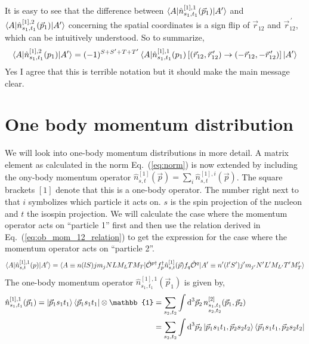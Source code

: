\documentclass[10pt]{article}
\begin{document}
It is easy to see that the difference between $\braket{ A | 
\hat{n}^{[1],1}_{s_1,t_1}(\vec{p}_1) | A'} $ and $\braket{ A | 
\hat{n}^{[1],2}_{s_1,t_1}(\vec{p}_1) | A'} $ concerning the spatial coordinates 
is a sign flip of $\vec{r}_{12}$ and $\vec{r}_{12}^{\, \prime}$, which can be 
intuitively understood. So to summarize,
\begin{align}
	\braket{ A | \hat{n}^{[1],2}_{s_1,t_1}(p_1) | A'} = (-1)^{S+S'+T+T'} 
\braket{ A | \hat{n}^{[1],1}_{s_1,t_1}(p_1) \left[ ( \vec{r}_{12}, 
\vec{r}_{12}^{\, \prime} ) \rightarrow ( - \vec{r}_{12}, - \vec{r}_{12}^{\, 
\prime} ) \right] | A'} 
	\label{eq:ob_mom_12_relation}
\end{align}
Yes I agree that this is terrible notation but it should make the main message 
clear.
\section{One body momentum distribution}
\label{sec:ob_mom_distr_derivation}
We will look into one-body momentum distributions in more detail. A matrix 
element as calculated in the norm Eq.~(\ref{eq:norm}) is now extended by 
including the ony-body momentum operator $ \hat{n}_{s,t}^{[1]}(\vec{p}) = 
\sum_{i} \hat{n}_{s,t}^{[1],i}(\vec{p})$. The square brackets $[1]$ denote that 
this is a one-body operator. The number right next to that $i$ symbolizes which 
particle it acts on. $s$ is the spin projection of the nucleon and $t$ the 
isospin projection. We will calculate the case where the momentum operator acts 
on ``particle 1'' first and then use the relation derived in 
Eq.~(\ref{eq:ob_mom_12_relation}) to get the expression for the case where the 
momentum operator acts on ``particle 2''.
\begin{align*}
	\braket{A | \hat{n}_{s,t}^{[1],1}(p) | A'} = \braket { A \equiv n (l S) 
j m_j N L M_L T M_T | \hat{\mathcal{O}}^{p\dagger} f_{p}^{\dagger} 
\hat{n}_{s,t}^{[1]}(\vec{p}) f_{q} \hat{ \mathcal{O}}^{q} | A' \equiv n' (l' 
S') j' m_{j'} N' L' M_{L'} T' M_T' }
\end{align*}
The one-body momentum operator $\hat{n}_{s_1,t_1}^{[1],1}(\vec{p}_1)$ is given 
by,
\begin{align*}
	\hat{n}_{s_1,t_1}^{[1],1}(\vec{p}_1) = \ket{\vec{p}_1 s_1 t_1} 
\bra{\vec{p}_1 s_1 t_1} \otimes \mathbb{1} &= \sum_{s_2,t_2} \int \text{d}^{3} 
\vec{p}_{2} \, n_{ \substack{ s_1,t_1 \\ s_2,t_2} }^{[2]}(\vec{p}_1,\vec{p}_2)\\
	& = \sum_{s_2,t_2} \int \text{d}^{3} \vec{p}_{2} \ket{ \vec{p}_1 s_1 
t_1, \vec{p}_2 s_2 t_2 } \bra { \vec{p}_1 s_1 t_1, \vec{p}_2 s_2 t_2}
\end{align*}
\end{document}
